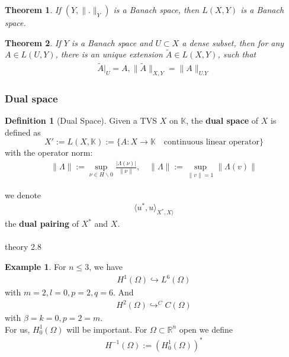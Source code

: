 \documentclass[a4paper,11pt,fleqn]{book}
\newtheorem{theorem}{Theorem}[section]
\theoremstyle{definition}
\newtheorem{definition}{Definition}[section]
\newtheorem*{example}{Example}
\theoremstyle{remark}
\begin{document}
\begin{theorem}
	If $(Y, \|.\|_Y)$ is a Banach space, then $L(X, Y)$ is a Banach space. 
\end{theorem}

\begin{theorem}
	If $Y$ is a Banach space and $U\subset X$ a dense subset, then for any $A \in L(U, Y)$, there is an unique extension $\tilde{A} \in L(X, Y)$, such that
	\begin{align*}
		\tilde{A}|_U = A, \|\tilde{A}\|_{X,Y} = \|A\|_{U. Y}
	\end{align*}
\end{theorem}

\subsubsection*{Dual space}

\begin{definition}[Dual Space]
	Given a TVS $X$ on $\mathbb{K}$, the \textbf{dual space} of $X$ is defined as
	\begin{equation*}
		X' := L(X, \mathbb{K}) := \{ A: X \rightarrow \mathbb{K} \quad \text{continuous linear operator}\}
	\end{equation*}
	with the operator norm:
	\begin{align*}
	\|\Lambda\|:= \sup_{\nu \in H \backslash 0} \frac{|\Lambda (\nu)|}{\|\nu\|}, \quad \|\Lambda\|:= \sup_{\|v\| = 1} \|\Lambda(v)\|
\end{align*}
\end{definition}

we denote 
\begin{align*}
	\langle u^*, u\rangle_{X^*, X\rangle}
\end{align*}
the \textbf{dual pairing} of $X^*$ and $X$. \\
\quad\\
theory 2.8
\begin{example}
	For $n \le 3$, we have
	\begin{align*}
		H^1(\Omega) \hookrightarrow L^6(\Omega)
	\end{align*}
	with $m = 2, l = 0, p = 2, q = 6$. And
	\begin{align*}
		H^2(\Omega) \hookrightarrow^C C(\Omega)
	\end{align*}
	with $\beta = k = 0, p = 2 = m$. \\
	For us, $H^1_0(\Omega)$ will be important. For $\Omega \subset \mathbb{R}^n$ open we define
	\begin{align*}
		H^{-1}(\Omega):= (H_0^1(\Omega))^*
	\end{align*}
\end{example}
\end{document}
